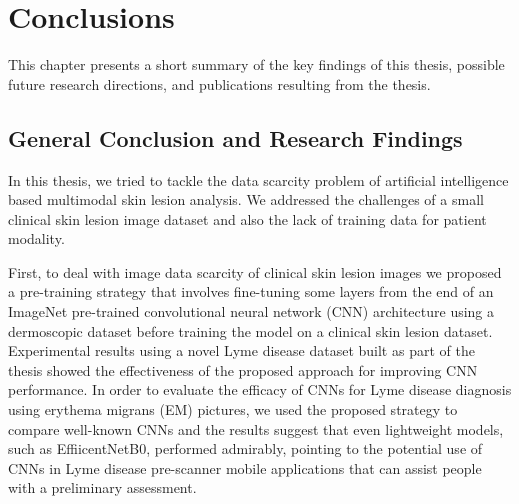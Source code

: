 \chapter{Conclusions}\label{chap:conclusions}

\begin{center}
	\begin{minipage}{0.8\textwidth}
		\begin{small}
			This chapter presents a short summary of the key findings of this thesis, possible future research directions, and publications resulting from the thesis. 
		\end{small}
	\end{minipage}
	\vspace{0.5cm}
\end{center}

\minitoc

\section{General Conclusion and Research Findings}
In this thesis, we tried to tackle the data scarcity problem of artificial intelligence based multimodal skin lesion analysis. We addressed the challenges of a small clinical skin lesion image dataset and also the lack of training data for patient modality. 

First, to deal with image data scarcity of clinical skin lesion images we proposed a pre-training strategy that involves fine-tuning some layers from the end of an ImageNet pre-trained convolutional neural network (CNN) architecture using a dermoscopic dataset before training the model on a clinical skin lesion dataset. Experimental results using a novel Lyme disease dataset built as part of the thesis showed the effectiveness of the proposed approach for improving CNN performance. In order to evaluate the efficacy of CNNs for Lyme disease diagnosis using erythema migrans (EM) pictures, we used the proposed strategy to compare well-known CNNs and the results suggest that even lightweight models, such as EffiicentNetB0, performed admirably, pointing to the potential use of CNNs in Lyme disease pre-scanner mobile applications that can assist people with a preliminary assessment.

